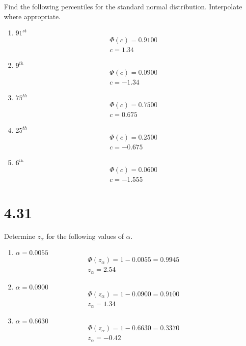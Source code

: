 \documentclass[letterpaper,12pt,fleqn]{article}
\renewcommand{\O}{\Phi}
\renewcommand{\a}{\alpha}
\begin{document}
Find the following percentiles for the standard normal distribution.  Interpolate where appropriate.
\begin{enumerate}[label={\alph*)}]
\item \(91^{st}\)
  \begin{gather*}
    \O(c)=0.9100 \\
    c=1.34
  \end{gather*}
\item \(9^{th}\)
  \begin{gather*}
    \O(c)=0.0900 \\
    c=-1.34
  \end{gather*}
\item \(75^{th}\)
  \begin{gather*}
    \O(c)=0.7500 \\
    c=0.675
  \end{gather*}
\item \(25^{th}\)
  \begin{gather*}
    \O(c)=0.2500 \\
    c=-0.675
  \end{gather*}
\item \(6^{th}\)
  \begin{gather*}
    \O(c)=0.0600 \\
    c=-1.555
  \end{gather*}
\end{enumerate}

\section*{4.31}

Determine \(z_{\a}\) for the following values of \(\a\).
\begin{enumerate}[label={\alph*)}]
\item \(\a=0.0055\)
  \begin{gather*}
    \O(z_{\a})=1-0.0055=0.9945 \\
    z_{\a}=2.54
  \end{gather*}
\item \(\a=0.0900\)
  \begin{gather*}
    \O(z_{\a})=1-0.0900=0.9100 \\
    z_{\a}=1.34
  \end{gather*}
\item \(\a=0.6630\)
  \begin{gather*}
    \O(z_{\a})=1-0.6630=0.3370 \\
    z_{\a}=-0.42
  \end{gather*}
\end{enumerate}
\end{document}
